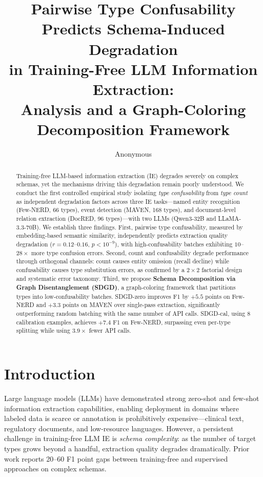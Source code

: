 \documentclass[11pt,a4paper]{article}
\title{Pairwise Type Confusability Predicts Schema-Induced Degradation\\in Training-Free LLM Information Extraction:\\Analysis and a Graph-Coloring Decomposition Framework}
\author{Anonymous}
\date{}
\begin{document}
\maketitle

\begin{abstract}
Training-free LLM-based information extraction (IE) degrades severely on complex schemas, yet the mechanisms driving this degradation remain poorly understood.
We conduct the first controlled empirical study isolating \emph{type confusability} from \emph{type count} as independent degradation factors across three IE tasks---named entity recognition (Few-NERD, 66 types), event detection (MAVEN, 168 types), and document-level relation extraction (DocRED, 96 types)---with two LLMs (Qwen3-32B and LLaMA-3.3-70B).
We establish three findings.
First, pairwise type confusability, measured by embedding-based semantic similarity, independently predicts extraction quality degradation ($r{=}0.12$--$0.16$, $p{<}10^{-9}$), with high-confusability batches exhibiting $10$--$28\times$ more type confusion errors.
Second, count and confusability degrade performance through orthogonal channels: count causes entity omission (recall decline) while confusability causes type substitution errors, as confirmed by a $2{\times}2$ factorial design and systematic error taxonomy.
Third, we propose \textbf{Schema Decomposition via Graph Disentanglement (SDGD)}, a graph-coloring framework that partitions types into low-confusability batches.
SDGD-zero improves F1 by $+5.5$ points on Few-NERD and $+3.3$ points on MAVEN over single-pass extraction, significantly outperforming random batching with the same number of API calls.
SDGD-cal, using 8 calibration examples, achieves $+7.4$ F1 on Few-NERD, surpassing even per-type splitting while using $3.9{\times}$ fewer API calls.
\end{abstract}

\section{Introduction}
\label{sec:intro}

Large language models (LLMs) have demonstrated strong zero-shot and few-shot information extraction capabilities, enabling deployment in domains where labeled data is scarce or annotation is prohibitively expensive---clinical text, regulatory documents, and low-resource languages.
However, a persistent challenge in training-free LLM IE is \emph{schema complexity}: as the number of target types grows beyond a handful, extraction quality degrades dramatically.
Prior work reports 20--60 F1 point gaps between training-free and supervised approaches on complex schemas.
\end{document}
